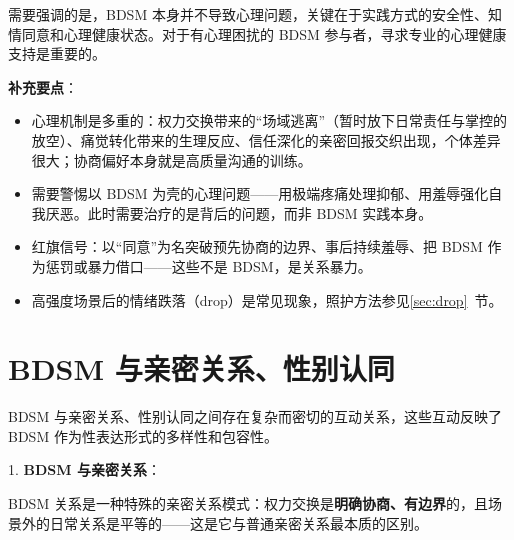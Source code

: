\documentclass[12pt,UTF8]{ctexbook}
\begin{document}
需要强调的是，BDSM 本身并不导致心理问题，关键在于实践方式的安全性、知情同意和心理健康状态。对于有心理困扰的 BDSM 参与者，寻求专业的心理健康支持是重要的。

\noindent\textbf{补充要点}：
\begin{itemize}
\item 心理机制是多重的：权力交换带来的“场域逃离”（暂时放下日常责任与掌控的放空）、痛觉转化带来的生理反应、信任深化的亲密回报交织出现，个体差异很大；协商偏好本身就是高质量沟通的训练。
\item 需要警惕以 BDSM 为壳的心理问题——用极端疼痛处理抑郁、用羞辱强化自我厌恶。此时需要治疗的是背后的问题，而非 BDSM 实践本身。
\item 红旗信号：以“同意”为名突破预先协商的边界、事后持续羞辱、把 BDSM 作为惩罚或暴力借口——这些不是 BDSM，是关系暴力。
\item 高强度场景后的情绪跌落（drop）是常见现象，照护方法参见\ref{sec:drop}~节。
\end{itemize}

\section{BDSM 与亲密关系、性别认同}

BDSM 与亲密关系、性别认同之间存在复杂而密切的互动关系，这些互动反映了 BDSM 作为性表达形式的多样性和包容性。

1. \textbf{BDSM 与亲密关系}：

BDSM 关系是一种特殊的亲密关系模式：权力交换是\textbf{明确协商、有边界}的，且场景外的日常关系是平等的——这是它与普通亲密关系最本质的区别。
\end{document}

